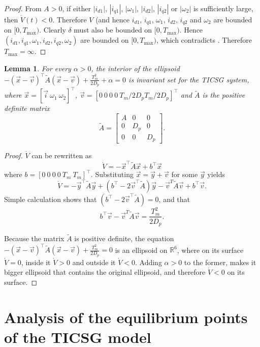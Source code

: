 \documentclass[letterpaper, 10 pt, conference]{ieeeconf}
\newtheorem{lemma}[theorem]{Lemma}
\renewcommand{\o}    {{\omega}}
\begin{document}
\begin{proof}
From $A>0$, if either $|i_{d1}|$, $|i_{q1}|$, $|\o_1|$, $|i_{d2}|$,
$|i_{q2}|$ or $|\o_2|$ is sufficiently large, then
$\dot{V}(t)<0$. Therefore $V$ (and hence $i_{d1}$, $i_{q1}$, $\o_1$,
$i_{d2}$, $i_{q2}$ and $\o_2$ are bounded on $[0,{T_{\max}})$. Clearly
$\delta$ must also be bounded on $[0,{T_{\max}})$. Hence $(i_{d1},
i_{q1},\o_1,i_{d2},i_{q2},\o_2)$ are bounded on $[0,{T_{\max}})$, which
contradicts \cite[Corollary II.3]{JayWeissBS:09}. Therefore 
${T_{\max}}=\infty$.
\end{proof}

\begin{lemma}\label{lemma:invariantSet}
For every $\alpha > 0$, the interior of the ellipsoid $-(\vec{x}-\vec{v})^\top \tilde{A} (\vec{x}-\vec{v})+\frac{T_m^2}{2D_p}+\alpha=0$ is invariant set for the TICSG system, where $\vec{x} =\left[\vec{i}\ \omega_1\ \omega_2 \right]^\top$, 
$\vec{v} = \left[0\ 0\ 0\ 0\ T_m/2D_p T_m/2D_p \right]^\top$ and $\tilde{A}$ is the positive definite matrix
$$\tilde{A}=
\left[\begin{array}{ccc}
   A & 0 & 0 \\ 
   0 & D_p & 0 \\
   0 & 0 & D_p\end{array}\right].
$$
\end{lemma}

\begin{proof} $\dot{V}$ can be rewritten as 
$$\dot{V} = -\vec{x}^\top \tilde{A} \vec{x}+b^\top \vec{x}$$
where $b = \left[ 0\ 0\ 0\ 0\ T_m\ T_m\right]^\top$. Substituting $\vec{x}=\vec{y}+\vec{v}$ for some $\vec{y}$ yields  $$\dot{V} = -\vec{y}^\top \tilde{A} \vec{y}+\left(b^\top-2\vec{v}^\top \tilde{A}\right)\vec{y}  -\vec{v}^T \tilde{A} \vec{v} +b^\top\vec{v} .$$
Simple calculation shows that $\left(b^\top-2\vec{v}^\top \tilde{A}\right)=0$, and that $$b^\top\vec{v}-\vec{v}^T \tilde{A} \vec{v} =\frac{T_m^2}{2D_p}.$$

Because the matrix $\tilde{A}$ is positive definite, the equation $-(\vec{x}-\vec{v})^\top \tilde{A} (\vec{x}-\vec{v})+\frac{T_m^2}{2D_p}=0$ is an ellipsoid on $\mathbb{R}^6$, where on its surface $\dot{V}=0$, inside it $\dot{V}>0$ and outside it $\dot{V}<0$. Adding $\alpha>0$ to the former, makes it bigger ellipsoid that contains the original ellipsoid, and therefore  $\dot{V}<0$ on its surface.  
 \end{proof}
\section{Analysis of the equilibrium points of the TICSG model} 
\label{sec4} %
\end{document}

